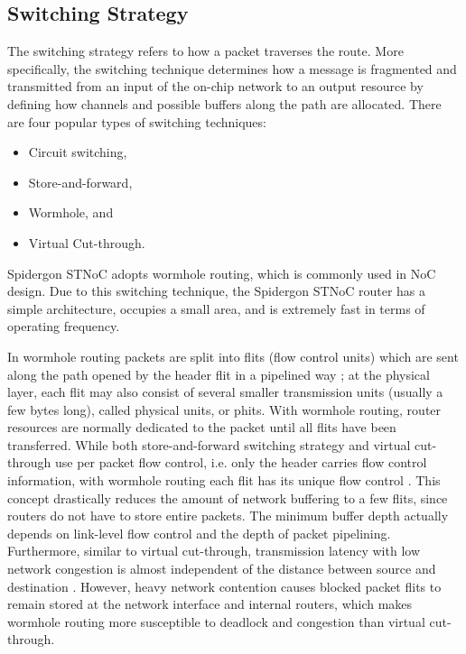 \subsection{Switching Strategy}\label{S:switching}

The switching strategy refers to how a packet traverses the route. 
More specifically, the switching technique determines how a message is fragmented and transmitted from an input of the on-chip network to an output resource by defining how channels and possible buffers along the path are allocated. 
There are four popular types of switching techniques:
\begin{itemize}
\item Circuit switching,
\item Store-and-forward,
\item Wormhole, and 
\item Virtual Cut-through.
\end{itemize}

Spidergon STNoC adopts wormhole routing, which is commonly used in NoC design. 
Due to this switching technique, the Spidergon STNoC router has a simple architecture, occupies a small area, and is extremely fast in terms of operating frequency.

In wormhole routing packets are split into flits (flow control units) which are sent along the path opened by the header flit in a pipelined way \cite{dally1987deadlock}; at the physical layer, each flit may also consist of several smaller transmission units (usually a few bytes long), called physical units, or phits. 
With wormhole routing, router resources are normally dedicated to the packet until all flits have been transferred. 
While both store-and-forward switching strategy and virtual cut-through use per packet flow control, i.e. only the header carries flow control information, with wormhole routing each flit has its unique flow control \cite{dally1987deadlock}. 
This concept drastically reduces the amount of network buffering to a few flits, since routers do not have to store entire packets. The minimum buffer depth actually depends on link-level flow control and the depth of packet pipelining. 
Furthermore, similar to virtual cut-through, transmission latency with low network congestion is almost independent of the distance between source and destination \cite{dally1990performance}. 
However, heavy network contention causes blocked packet flits to remain stored at the network interface and internal routers, which makes wormhole routing more susceptible to deadlock and congestion than virtual cut-through.

